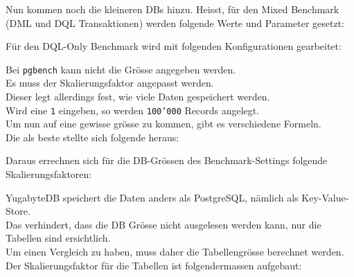 \begin{flushleft}
    Nun kommen noch die kleineren DBs hinzu.
    Heisst, für den Mixed Benchmark (DML und DQL \Gls{Transaktion}en) werden folgende Werte und Parameter gesetzt:
    
\end{flushleft}
\begin{flushleft}
    Für den DQL-Only Benchmark wird mit folgenden Konfigurationen gearbeitet:
    
\end{flushleft}
\begin{flushleft}
    Bei \texttt{pgbench} kann nicht die Grösse angegeben werden.\\
    Es muss der Skalierungsfaktor angepasst werden.\\
    Dieser legt allerdings fest, wie viele Daten gespeichert werden.\\
    Wird eine \texttt{1} eingeben, so werden \texttt{100'000} Records angelegt.\\

    Um nun auf eine gewisse grösse zu kommen, gibt es verschiedene Formeln.\\
    Die als beste stellte sich folgende heraus\cite{DKXU3QRC}:\\
    
\end{flushleft}
\begin{flushleft}
    Daraus errechnen sich für die DB-Grössen des Benchmark-Settings folgende Skalierungsfaktoren:\\
    
\end{flushleft}
\begin{flushleft}
    YugabyteDB speichert die Daten anders als PostgreSQL, nämlich als \Gls{Key-Value-Store}.\\
    Das verhindert, dass die DB Grösse nicht ausgelesen werden kann, nur die Tabellen sind ersichtlich.\\
    Um einen Vergleich zu haben, muss daher die Tabellengrösse berechnet werden.\\
    Der Skalierungsfaktor für die Tabellen ist folgendermassen aufgebaut:\\
    
\end{flushleft}
